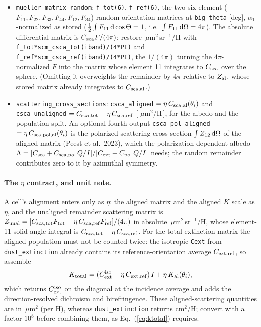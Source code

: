 \documentclass{my_memo}
\newcommand{\code}[1]{\texttt{#1}}
\newcommand{\um}{\ensuremath{\,\mu\mathrm{m}}}
\begin{document}
\begin{itemize}
      header's symmetry relations.
\item \code{mueller\_matrix\_random}: \code{f\_tot(6)}, \code{f\_ref(6)}, the two
      six-element ($F_{11},F_{22},F_{33},F_{44},F_{12},F_{34}$) random-orientation
      matrices at \code{big\_theta} [deg], $\alpha_1$-normalized as stored
      ($\tfrac12\int F_{11}\,{\rm d}\cos\Theta=1$, i.e.\ $\int F_{11}\,{\rm
      d}\Omega=4\pi$). The absolute differential matrix is $C_{\rm sca}F/(4\pi)$:
      restore \um$^2$\,sr$^{-1}$/H with
      \code{f\_tot*scm\_csca\_tot(iband)/(4*PI)} and
      \code{f\_ref*scm\_csca\_ref(iband)/(4*PI)}, the $1/(4\pi)$ turning the
      $4\pi$-normalized $F$ into the matrix whose element 11 integrates to
      $C_{\rm sca}$ over the sphere. (Omitting it overweights the remainder by
      $4\pi$ relative to $Z_{\rm al}$, whose stored matrix already integrates to
      $C_{\rm sca,al}$.)
\item \code{scattering\_cross\_sections}: \code{csca\_aligned} $=\eta\,
      C_{\rm sca,al}(\theta_i)$ and \code{csca\_unaligned}
      $=C_{\rm sca,tot}-\eta\,C_{\rm sca,ref}$ [\,\um$^2$/H\,], for the albedo and
      the population split. An optional fourth output
      \code{csca\_pol\_aligned} $=\eta\,C_{\rm sca,pol,al}(\theta_i)$ is the
      polarized scattering cross section $\int Z_{12}\,{\rm d}\Omega$ of the
      aligned matrix (Peest et al.\ 2023), which the polarization-dependent albedo
      $\Lambda=[C_{\rm sca}+C_{\rm sca,pol}\,Q/I]/[C_{\rm ext}+C_{\rm pol}\,Q/I]$
      needs; the random remainder contributes zero to it by azimuthal symmetry.
\end{itemize}

\paragraph{The $\eta$ contract, and unit note.} A cell's alignment enters only as
$\eta$: the aligned matrix and the aligned $K$ scale as $\eta$, and the unaligned
remainder scattering matrix is
$Z_{\rm unal}=[C_{\rm sca,tot}F_{\rm tot}-\eta\,C_{\rm sca,ref}F_{\rm ref}]/(4\pi)$
in absolute \um$^2$\,sr$^{-1}$/H, whose element-11 solid-angle integral is
$C_{\rm sca,tot}-\eta\,C_{\rm sca,ref}$.
For the total extinction matrix the aligned population must not be counted twice:
the isotropic \code{Cext} from \code{dust\_extinction} already contains its
reference-orientation average $C_{\rm ext,ref}$, so assemble
\begin{equation}
  K_{\rm total} = (C_{\rm ext}^{\rm iso} - \eta\,C_{\rm ext,ref})\,I
                  + \eta\,K_{\rm al}(\theta_i),
\label{eq:ktotal}
\end{equation}
which returns $C_{\rm ext}^{\rm iso}$ on the diagonal at the incidence average and
adds the direction-resolved dichroism and birefringence. These aligned-scattering
quantities are in \um$^2$ (per H), whereas \code{dust\_extinction} returns cm$^2$/H;
convert with a factor $10^{8}$ before combining them, as
Eq.~(\ref{eq:ktotal}) requires.
\end{document}
